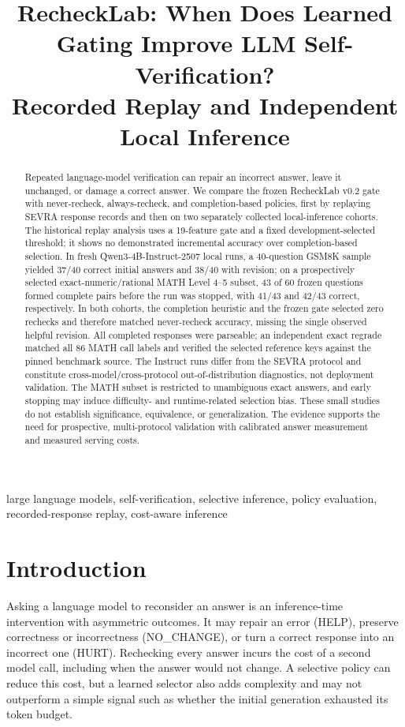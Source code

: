 \documentclass[conference]{IEEEtran}
\title{RecheckLab: When Does Learned Gating Improve LLM Self-Verification?\\
Recorded Replay and Independent Local Inference}
\author{\IEEEauthorblockN{Anonymous Authors}}
\begin{document}
\maketitle

\begin{abstract}
Repeated language-model verification can repair an incorrect answer, leave it unchanged, or damage a correct answer. We compare the frozen RecheckLab v0.2 gate with never-recheck, always-recheck, and completion-based policies, first by replaying SEVRA response records and then on two separately collected local-inference cohorts. The historical replay analysis uses a 19-feature gate and a fixed development-selected threshold; it shows no demonstrated incremental accuracy over completion-based selection. In fresh Qwen3-4B-Instruct-2507 local runs, a 40-question GSM8K sample yielded 37/40 correct initial answers and 38/40 with revision; on a prospectively selected exact-numeric/rational MATH Level 4--5 subset, 43 of 60 frozen questions formed complete pairs before the run was stopped, with 41/43 and 42/43 correct, respectively. In both cohorts, the completion heuristic and the frozen gate selected zero rechecks and therefore matched never-recheck accuracy, missing the single observed helpful revision. All completed responses were parseable; an independent exact regrade matched all 86 MATH call labels and verified the selected reference keys against the pinned benchmark source. The Instruct runs differ from the SEVRA protocol and constitute cross-model/cross-protocol out-of-distribution diagnostics, not deployment validation. The MATH subset is restricted to unambiguous exact answers, and early stopping may induce difficulty- and runtime-related selection bias. These small studies do not establish significance, equivalence, or generalization. The evidence supports the need for prospective, multi-protocol validation with calibrated answer measurement and measured serving costs.
\end{abstract}

\begin{IEEEkeywords}
large language models, self-verification, selective inference, policy evaluation, recorded-response replay, cost-aware inference
\end{IEEEkeywords}

\section{Introduction}
Asking a language model to reconsider an answer is an inference-time intervention with asymmetric outcomes. It may repair an error (HELP), preserve correctness or incorrectness (NO\_CHANGE), or turn a correct response into an incorrect one (HURT). Rechecking every answer incurs the cost of a second model call, including when the answer would not change. A selective policy can reduce this cost, but a learned selector also adds complexity and may not outperform a simple signal such as whether the initial generation exhausted its token budget.
\end{document}
